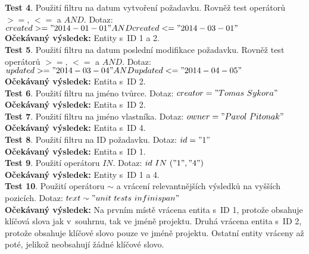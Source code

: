 \documentclass[11pt,oneside]{fithesis2}
\begin{document}
\noindent
\textbf{Test 4}. Použití filtru na datum vytvoření požadavku. Rovněž test operátorů $>=$, $<=$ a $AND$. Dotaz: $created >= "2014-01-01" AND \\ created <= "2014-03-01"$ \\
\textbf{Očekávaný výsledek:} Entity s~ID 1 a 2. \\[12pt]

\noindent
\textbf{Test 5}. Použití filtru na datum poslední modifikace požadavku. Rovněž test operátorů $>=$, $<=$ a $AND$. Dotaz: $updated >= "2014-03-04" AND \\ updated <= "2014-04-05"$ \\
\textbf{Očekávaný výsledek:} Entita s~ID 2. \\[12pt]

\noindent
\textbf{Test 6}. Použití filtru na jméno tvůrce. Dotaz: $creator = "Tomas~Sykora"$ \\
\textbf{Očekávaný výsledek:} Entita s~ID 2. \\[12pt]

\noindent
\textbf{Test 7}. Použití filtru na jméno vlastníka. Dotaz: $owner = "Pavol~Pitonak"$ \\
\textbf{Očekávaný výsledek:} Entita s~ID 4. \\[12pt]

\noindent
\textbf{Test 8}. Použití filtru na ID požadavku. Dotaz: $id = "1"$ \\
\textbf{Očekávaný výsledek:} Entita s~ID 1. \\[12pt]

\noindent
\textbf{Test 9}. Použití operátoru $IN$. Dotaz: $id~IN~("1", "4")$ \\
\textbf{Očekávaný výsledek:} Entity s~ID 1 a 4. \\[12pt]

\noindent
\textbf{Test 10}. Použití operátoru $\sim$ a vrácení relevantnějších výsledků na vyšších pozicích. Dotaz: $text \sim "unit~tests~infinispan"$ \\
\textbf{Očekávaný výsledek:} Na prvním místě vrácena entita s~ID 1, protože obsahuje klíčová slova jak v~souhrnu, tak ve jméně projektu. Druhá vrácena entita s~ID 2, protože obsahuje klíčové slovo pouze ve jméně projektu. Ostatní entity vráceny až poté, jelikož neobsahují žádné klíčové slovo.


\end{document}
